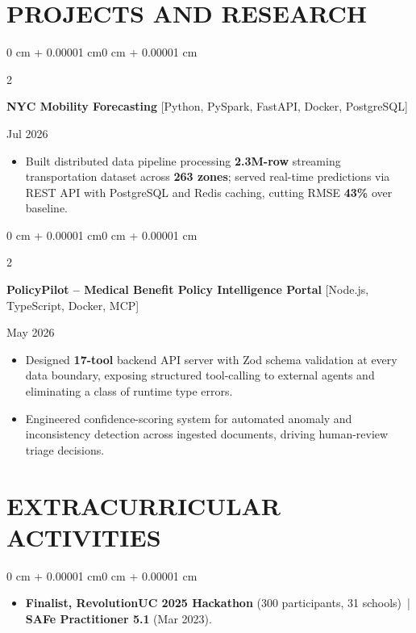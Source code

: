 \documentclass[10pt, letterpaper]{article}
\newenvironment{highlights}{
    \begin{itemize}[
        topsep=0.10 cm,
        parsep=0.06 cm,
        partopsep=0pt,
        itemsep=0.06 cm,
        leftmargin=12pt
    ]
}{
    \end{itemize}
}
\newenvironment{onecolentry}{
    \begin{adjustwidth}{0 cm + 0.00001 cm}{0 cm + 0.00001 cm}
}{
    \end{adjustwidth}
}
\newenvironment{twocolentry}[2][]{
    \onecolentry
    \def\secondColumn{#2}
    \setcolumnwidth{\fill, 4.5 cm}
    \begin{paracol}{2}
}{
    \switchcolumn \raggedleft \secondColumn
    \end{paracol}
    \endonecolentry
}
\begin{document}
\section{PROJECTS AND RESEARCH}
\begin{twocolentry}{Jul 2026}
\textbf{NYC Mobility Forecasting} [Python, PySpark, FastAPI, Docker, PostgreSQL]
\end{twocolentry}
\begin{highlights}
  \item Built distributed data pipeline processing \textbf{2.3M-row} streaming transportation dataset across \textbf{263 zones}; served real-time predictions via REST API with PostgreSQL and Redis caching, cutting RMSE \textbf{43\%} over baseline.
\end{highlights}

\vspace{0.12 cm}

\begin{twocolentry}{May 2026}
\textbf{PolicyPilot -- Medical Benefit Policy Intelligence Portal} [Node.js, TypeScript, Docker, MCP]
\end{twocolentry}
\begin{highlights}
  \item Designed \textbf{17-tool} backend API server with Zod schema validation at every data boundary, exposing structured tool-calling to external agents and eliminating a class of runtime type errors.
  \item Engineered confidence-scoring system for automated anomaly and inconsistency detection across ingested documents, driving human-review triage decisions.
\end{highlights}

\section{EXTRACURRICULAR ACTIVITIES}
\begin{onecolentry}
\begin{highlights}
  \item \textbf{Finalist, RevolutionUC 2025 Hackathon} (300 participants, 31 schools) \,|\, \textbf{SAFe Practitioner 5.1} (Mar 2023).
\end{highlights}
\end{onecolentry}
\end{document}
